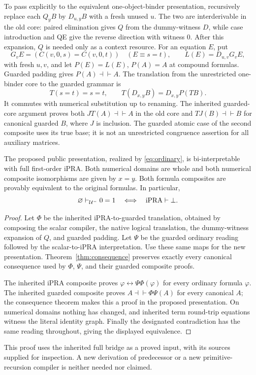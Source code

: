 To pass explicitly to the equivalent one-object-binder presentation,
recursively replace each $Q_yB$ by $D_{u,y}B$ with a fresh unused $u$.
The two are interderivable in the old core: paired elimination gives $Q$
from the dummy-witness $D$, while case introduction and QE give the reverse
direction with witness $0$. After this expansion, $Q$ is needed only as a
context resource. For an equation $E$, put
\[
 G_vE=(C(v,0,s)=C(v,0,t))\quad(E\equiv s=t),\qquad
 L(E)=D_{u,v}G_vE,
\]
with fresh $u,v$, and let $P(E)=L(E)$, $P(A)=A$ at compound formulas.
Guarded padding gives $P(A)\dashv\vdash A$. The translation from the
unrestricted one-binder core to the guarded grammar is
\[
 T(s=t)=s=t,\qquad T(D_{x,y}B)=D_{x,y}P(TB).
\]
It commutes with numerical substitution up to renaming. The inherited
guarded-core argument proves both $JT(A)\dashv\vdash A$ in the old core
and $TJ(B)\dashv\vdash B$ for canonical guarded $B$, where $J$ is inclusion.
The guarded atomic case of the second composite uses its true base; it is
not an unrestricted congruence assertion for all auxiliary matrices.

\begin{theorem}
\label{thm:biinterp}
The proposed public presentation, realized by \eqref{eq:ordinary}, is
bi-interpretable with full first-order iPRA. Both numerical domains are
whole and both numerical composite isomorphisms are given by $x=y$.
Both formula composites are provably equivalent to the original formulas.
In particular,
\[
 \varnothing\vdash_{\mathcal U^{-}}0=1
 \quad\Longleftrightarrow\quad
 \mathrm{iPRA}\vdash\bot.
\]
\end{theorem}
\begin{proof}
Let $\Phi$ be the inherited iPRA-to-guarded translation, obtained by
composing the scalar compiler, the native logical translation, the
dummy-witness expansion of $Q$, and guarded padding. Let $\Psi$ be the
guarded ordinary reading followed by the
scalar-to-iPRA interpretation. Use these same maps for the new presentation.
Theorem~\ref{thm:consequence} preserves exactly every canonical consequence
used by $\Phi$, $\Psi$, and their guarded composite proofs.

The inherited iPRA composite proves
$\varphi\leftrightarrow\Psi\Phi(\varphi)$ for every ordinary formula
$\varphi$. The inherited guarded composite proves
$A\dashv\vdash\Phi\Psi(A)$ for every canonical $A$; the consequence
theorem makes this a proof in the proposed presentation. On numerical
domains nothing has changed, and inherited term round-trip equations
witness the literal identity graph. Finally the designated contradiction
has the same reading throughout, giving the displayed equivalence.
\end{proof}

This proof uses the inherited full bridge as a proved input, with its
sources supplied for inspection. A new derivation of predecessor or a new
primitive-recursion compiler is neither needed nor claimed.


